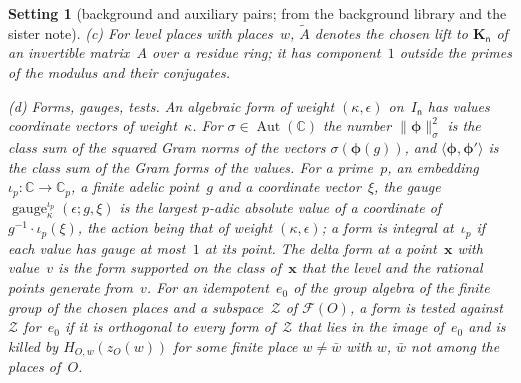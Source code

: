 \documentclass[11pt,a4paper]{article}
\newcommand{\kw}[1]{\emph{#1}}
\newcommand{\m}[1]{\mbox{$#1$}}        %
\theoremstyle{plainx}
\theoremstyle{uprightx}
\newtheorem{setting}[theorem]{Setting}          %
\newcommand{\CC}{\mathbb{C}}
\newcommand{\ix}[1]{\mathsf{#1}}
\newcommand{\KK}[1]{\mathbf{K}_{#1}}
\newcommand{\ip}[2]{\langle #1,#2\rangle}
\newcommand{\AutC}{\operatorname{Aut}(\CC)}
\newcommand{\FormVx}[1]{\mathcal{F}(#1)}
\newcommand{\gau}[5]{\operatorname{gauge}^{#1}_{#2}(#3;#4,#5)}
\newcommand{\nsq}[2]{\|#1\|^{2}_{#2}}
\begin{document}
\begin{setting}[background and auxiliary pairs; from the background library and the sister note]
\emph{(c)} For level places with places~$w$, \m{\tilde A} denotes the chosen lift to \m{\KK{\ix n}} of an invertible
matrix~$A$ over a residue ring; it has component~$1$ outside the primes of the modulus and their conjugates.

\emph{(d) Forms, gauges, tests.} An algebraic form of weight \m{(\kappa,\epsilon)} on~$I_{\ix n}$ has values
coordinate vectors of weight~$\kappa$. For \m{\sigma\in\AutC} the number \m{\nsq{\boldsymbol{\phi}}{\sigma}} is the class sum of
the squared Gram norms of the vectors \m{\sigma(\boldsymbol{\phi}(g))}, and \m{\ip{\boldsymbol{\phi}}{\boldsymbol{\phi}'}} is the class sum of the Gram forms
of the values. For a prime~$p$, an embedding \m{\iota_p\colon\CC\to\CC_p}, a finite adelic point~$g$ and a
coordinate vector~$\xi$, the \kw{gauge} \m{\gau{\iota_p}{\kappa}{\epsilon}{g}{\xi}} is the largest $p$-adic absolute value of
a coordinate of \m{g^{-1}\cdot\iota_p(\xi)}, the action being that of weight \m{(\kappa,\epsilon)}; a form is \kw{integral
at~$\iota_p$} if each value has gauge at most~$1$ at its point. The \kw{delta form} at a point~$\mathbf{x}$ with value~$v$ is the
form supported on the class of~$\mathbf{x}$ that the level and the rational points generate from~$v$. For an idempotent~$e_0$
of the group algebra of the finite group of the chosen places and a subspace~$\mathcal{Z}$ of \m{\FormVx{O}}, a form is
\kw{tested against~$\mathcal{Z}$ for~$e_0$} if it is orthogonal to every form of~$\mathcal{Z}$ that lies in the image
of~$e_0$ and is killed by \m{H_{O,w}(z_O(w))} for some finite place \m{w\ne\bar w} with $w$, $\bar w$ not among the
places of~$O$.
\end{setting}
\end{document}
